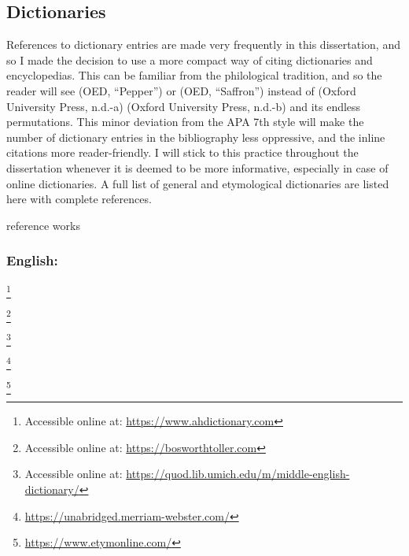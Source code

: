 
\subsection{Dictionaries}

References to dictionary entries are made very frequently in this dissertation, and so I made the decision to use a more compact way of citing dictionaries and encyclopedias. This can be familiar from the philological tradition, and so the reader will see (OED, ``Pepper'') or (OED, ``Saffron'') instead of (Oxford University Press, n.d.-a) (Oxford University Press, n.d.-b) and its endless permutations. This minor deviation from the APA 7th style will make the number of dictionary entries in the bibliography less oppressive, and the inline citations more reader-friendly. I will stick to this practice throughout the dissertation whenever it is deemed to be more informative, especially in case of online dictionaries. A full list of general and etymological dictionaries are listed here with complete references.

reference works

\subsubsection{English:}

\textcite{editors_of_the_american_heritage_dictionaries_american_2022} \footnote{Accessible online at: \url{https://www.ahdictionary.com}}

\noindent \textcite{bosworth_anglo-saxon_2014} \footnote{Accessible online at: \url{https://bosworthtoller.com}}

\noindent \textcite{hoad_concise_2003} 

\noindent \textcite{lewis_middle_1952} \footnote{Accessible online at: \url{https://quod.lib.umich.edu/m/middle-english-dictionary/}} 

\noindent \textcite{merriam-webster_merriam_nodate} \footnote{\url{https://unabridged.merriam-webster.com/}}

\noindent \textcite{harper_online_nodate} \footnote{\url{https://www.etymonline.com/}}

\noindent \textcite{oed} 

